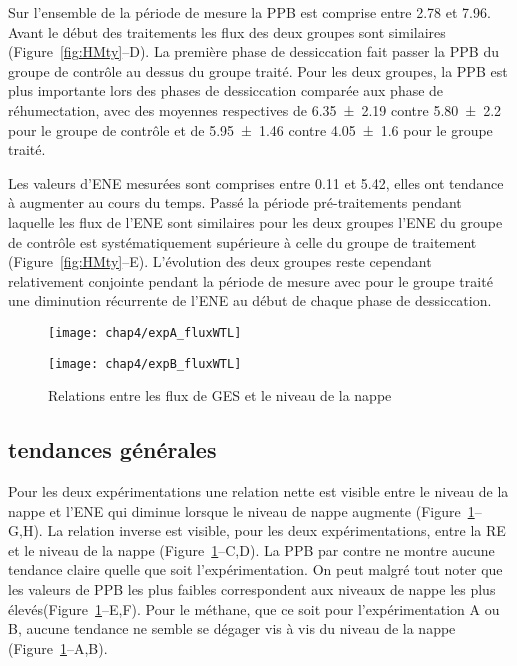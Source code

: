 Sur l'ensemble de la période de mesure la PPB est comprise entre \num{2.78} et \SI{7.96}{\uml}.
Avant le début des traitements les flux des deux groupes sont similaires (Figure~\ref{fig:HMty}--D).
La première phase de dessiccation fait passer la PPB du groupe de contrôle au dessus du groupe traité.
Pour les deux groupes, la PPB est plus importante lors des phases de dessiccation comparée aux phase de réhumectation, avec des moyennes respectives de \num{6.35(219)} contre \num{5.80(220)} pour le groupe de contrôle et de \num{5.95(146)} contre \SI{4.05(160)}{\uml} pour le groupe traité.

Les valeurs d'ENE mesurées sont comprises entre \num{0.11} et \SI{5.42}{\uml}, elles ont tendance à augmenter au cours du temps.
Passé la période pré-traitements pendant laquelle les flux de l'ENE sont similaires pour les deux groupes l'ENE du groupe de contrôle est systématiquement supérieure à celle du groupe de traitement (Figure~\ref{fig:HMty}--E).
L'évolution des deux groupes reste cependant relativement conjointe pendant la période de mesure avec pour le groupe traité une diminution récurrente de l'ENE au début de chaque phase de dessiccation.

\begin{figure}
\centering
\begin{minipage}{.5\textwidth}
\centering
\texttt{[image: chap4/expA\_fluxWTL]}
\end{minipage}%
\begin{minipage}{.5\textwidth}
\centering
\texttt{[image: chap4/expB\_fluxWTL]}
\end{minipage}%
\caption{Relations entre les flux de GES et le niveau de la nappe}
\label{fig:hm_wtl}
\end{figure}

\subsection{tendances générales}

Pour les deux expérimentations une relation nette est visible entre le niveau de la nappe et l'ENE qui diminue lorsque le niveau de nappe augmente (Figure~\ref{fig:hm_wtl}--G,H).
La relation inverse est visible, pour les deux expérimentations, entre la RE et le niveau de la nappe (Figure~\ref{fig:hm_wtl}--C,D).
La PPB par contre ne montre aucune tendance claire quelle que soit l'expérimentation.
On peut malgré tout noter que les valeurs de PPB les plus faibles correspondent aux niveaux de nappe les plus élevés(Figure~\ref{fig:hm_wtl}--E,F).
Pour le méthane, que ce soit pour l'expérimentation A ou B, aucune tendance ne semble se dégager vis à vis du niveau de la nappe (Figure~\ref{fig:hm_wtl}--A,B).



